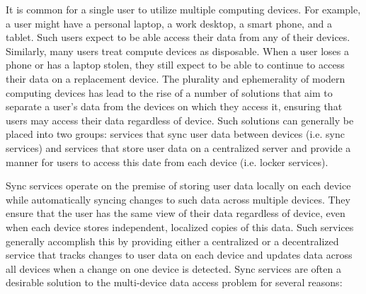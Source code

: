 It is common for a single user to utilize multiple computing
devices. For example, a user might have a personal laptop, a work
desktop, a smart phone, and a tablet. Such users expect to be able
access their data from any of their devices. Similarly, many users
treat compute devices as disposable. When a user loses a phone or has
a laptop stolen, they still expect to be able to continue to access
their data on a replacement device. The plurality and ephemerality of
modern computing devices has lead to the rise of a number of solutions
that aim to separate a user's data from the devices on which they
access it, ensuring that users may access their data regardless of
device. Such solutions can generally be placed into two groups:
services that sync user data between devices (i.e. sync services) and
services that store user data on a centralized server and provide a
manner for users to access this date from each device (i.e. locker
services).

Sync services operate on the premise of storing user data locally on
each device while automatically syncing changes to such data across
multiple devices. They ensure that the user has the same view of
their data regardless of device, even when each device stores
independent, localized copies of this data. Such services generally
accomplish this by providing either a centralized or a decentralized
service that tracks changes to user data on each device and updates
data across all devices when a change on one device is detected. Sync
services are often a desirable solution to the multi-device data
access problem for several reasons:


